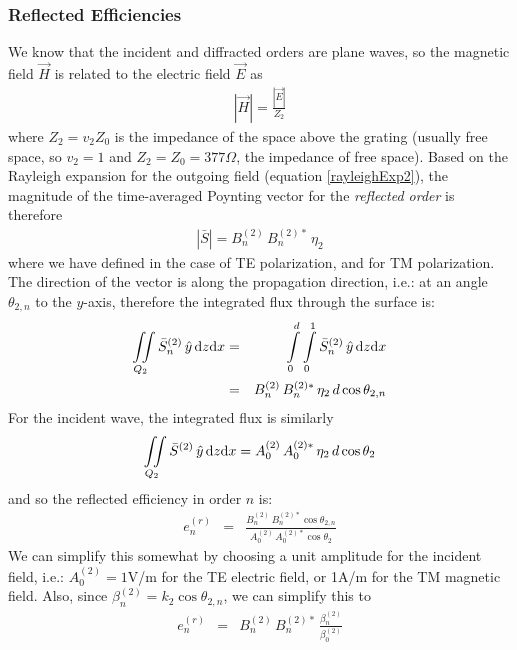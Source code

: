 \subsubsection{Reflected Efficiencies}
We know that the incident and diffracted orders are plane waves, so the magnetic field $\vec H$ is related to the electric field $\vec E$ as
\begin{eqnarray}
\left| \vec H \right| = \frac{\left| \vec E \right|}{Z_2}
\end{eqnarray}
where $Z_2 = v_2 Z_0$ is the impedance of the space above the grating (usually free space, so $v_2=1$ and $Z_2 = Z_0 = 377\Omega$, the impedance of free space). Based on the Rayleigh expansion for the outgoing field (equation \ref{rayleighExp2}), the magnitude of the time-averaged Poynting vector for the \emph{reflected order} is therefore
\begin{eqnarray}
\left| \bar S \right| = B_n^{(2)} \, B_n^{(2)\ast} \, \eta_2
\end{eqnarray}
where we have defined  in the case of TE polarization, and  for TM polarization.  The direction of the vector is along the propagation direction, i.e.: at an angle $\theta_{2,n}$ to the $y$-axis, therefore the integrated flux through the surface is:
\begin{eqnarray}
\iint \limits_{Q_2} \bar S_n^{(2)} \, \hat y \, \mathrm{d} z \mathrm{d} x &=& \int \limits_0^d \int \limits_0^1 \bar S_n^{(2)} \, \hat y \, \mathrm{d} z \mathrm{d} x \\
&=& B_n^{(2)} \, B_n^{(2)\ast} \, \eta_2 \, d \cos \theta_{2,n} 
\end{eqnarray}
For the incident wave, the integrated flux is similarly 
\begin{eqnarray}
\iint \limits_{Q_2} \bar S^{(2)} \, \hat y \, \mathrm{d} z \mathrm{d} x = A_0^{(2)} \, A_0^{(2)\ast} \, \eta_2 \, d \cos \theta_{2} 
\end{eqnarray}
and so the reflected efficiency in order $n$ is:
\begin{eqnarray}
e_n^{(r)} &=& \frac{    B_n^{(2)} \, B_n^{(2)\ast} \cos \theta_{2,n}       }{    A_0^{(2)} \, A_0^{(2)\ast}  \cos \theta_{2}     }
\end{eqnarray}
We can simplify this somewhat by choosing a unit amplitude for the incident field, i.e.: $A_0^{(2)} = 1$V/m for the TE electric field, or 1A/m for the TM magnetic field. Also, since $\beta_n^{(2)} = k_2 \cos \theta_{2,n}$, we can simplify this to
\begin{eqnarray}
e_n^{(r)} &=& B_n^{(2)} \, B_n^{(2)\ast} \, \frac{     \beta_n^{(2)}       }{    \beta_0^{(2)}      }
\end{eqnarray}

